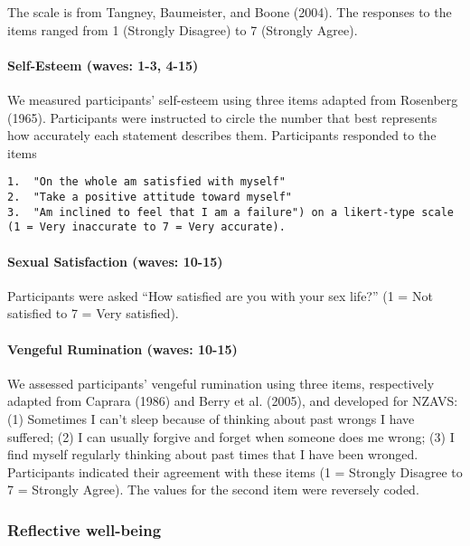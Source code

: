 \documentclass[
  letterpaper,
  DIV=11,
  numbers=noendperiod]{scrartcl}
\let\oldparagraph\paragraph
\renewcommand{\paragraph}[1]{\oldparagraph{#1}\mbox{}}
\begin{document}
The scale is from Tangney, Baumeister, and Boone (2004). The responses
to the items ranged from 1 (Strongly Disagree) to 7 (Strongly Agree).

\hypertarget{self-esteem-waves-1-3-4-15}{%
\paragraph{Self-Esteem (waves: 1-3,
4-15)}\label{self-esteem-waves-1-3-4-15}}

We measured participants' self-esteem using three items adapted from
Rosenberg (1965). Participants were instructed to circle the number that
best represents how accurately each statement describes them.
Participants responded to the items

\begin{verbatim}
1.  "On the whole am satisfied with myself"
2.  "Take a positive attitude toward myself"
3.  "Am inclined to feel that I am a failure") on a likert-type scale (1 = Very inaccurate to 7 = Very accurate).
\end{verbatim}

\hypertarget{sexual-satisfaction-waves-10-15}{%
\paragraph{Sexual Satisfaction (waves:
10-15)}\label{sexual-satisfaction-waves-10-15}}

Participants were asked ``How satisfied are you with your sex life?'' (1
= Not satisfied to 7 = Very satisfied).

\hypertarget{vengeful-rumination-waves-10-15}{%
\paragraph{Vengeful Rumination (waves:
10-15)}\label{vengeful-rumination-waves-10-15}}

We assessed participants' vengeful rumination using three items,
respectively adapted from Caprara (1986) and Berry et al. (2005), and
developed for NZAVS: (1) Sometimes I can't sleep because of thinking
about past wrongs I have suffered; (2) I can usually forgive and forget
when someone does me wrong; (3) I find myself regularly thinking about
past times that I have been wronged. Participants indicated their
agreement with these items (1 = Strongly Disagree to 7 = Strongly
Agree). The values for the second item were reversely coded.

\hypertarget{reflective-well-being}{%
\subsubsection{Reflective well-being}\label{reflective-well-being}}
\end{document}
